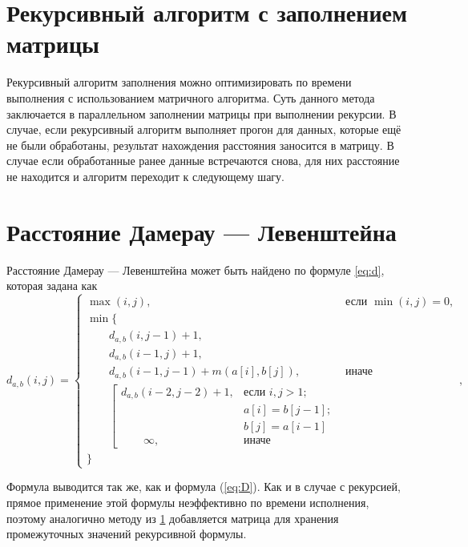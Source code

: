 \documentclass[a4paper,14pt, unknownkeysallowed]{extreport}
\begin{document}
\section{Рекурсивный алгоритм с заполнением матрицы}
\label{sec:recmat}

Рекурсивный алгоритм заполнения можно оптимизировать по времени выполнения с использованием матричного алгоритма. Суть данного метода заключается в параллельном заполнении матрицы при выполнении рекурсии. В случае, если рекурсивный алгоритм выполняет прогон для данных, которые ещё не были обработаны, результат нахождения расстояния заносится в матрицу. В случае если обработанные ранее данные встречаются снова, для них расстояние не находится и алгоритм переходит к следующему шагу.

\section{Расстояние Дамерау — Левенштейна}

Расстояние Дамерау — Левенштейна может быть найдено по формуле \ref{eq:d}, которая задана как
\begin{equation}
	\label{eq:d}
	d_{a, b}(i, j) = \begin{cases}
		\max(i, j), &\text{если }\min(i, j) = 0,\\
		\min \lbrace \\
			\qquad d_{a, b}(i, j - 1) + 1,\\
			\qquad d_{a, b}(i - 1, j) + 1,\\
			\qquad d_{a, b}(i - 1, j - 1) + m(a[i], b[j]), &\text{иначе}\\
			\qquad \left[ \begin{array}{cc}d_{a,b}(i - 2, j - 2) + 1, &\text{если }i, j > 1;\\
			\qquad &\text{}a[i] = b[j - 1]; \\
			\qquad &\text{}b[j] = a[i - 1]\\
			\qquad \infty, & \text{иначе}\end{array}\right.\\
		\rbrace
		\end{cases},
\end{equation}

Формула выводится так же, как и формула (\ref{eq:D}).
Как и в случае с рекурсией, прямое применение этой формулы неэффективно по времени исполнения, поэтому аналогично методу из \ref{sec:recmat} добавляется матрица для хранения промежуточных значений рекурсивной формулы.
\end{document}

